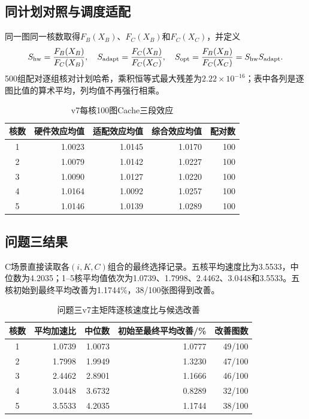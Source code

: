 \subsection{同计划对照与调度适配}
同一图同一核数取得$F_B(X_B)$、$F_C(X_B)$和$F_C(X_C)$，并定义
\begin{equation}
S_{\rm hw}=\frac{F_B(X_B)}{F_C(X_B)},\quad S_{\rm adapt}=\frac{F_C(X_B)}{F_C(X_C)},\quad S_{\rm opt}=\frac{F_B(X_B)}{F_C(X_C)}=S_{\rm hw}S_{\rm adapt}.
\label{eq:cache-factors}
\end{equation}
500组配对逐组核对计划哈希，乘积恒等式最大残差为$2.22\times10^{-16}$；表中各列是逐图比值的算术平均，列均值不再强行相乘。
\begin{table}[H]\centering\small\caption{v7每核100图Cache三段效应}\label{tab:cache-factors}
\begin{tabular}{crrrr}\toprule
核数 & 硬件效应均值 & 适配效应均值 & 综合效应均值 & 配对数\\\midrule
1 & 1.0023 & 1.0145 & 1.0170 & 100\\
2 & 1.0079 & 1.0142 & 1.0227 & 100\\
3 & 1.0090 & 1.0127 & 1.0220 & 100\\
4 & 1.0164 & 1.0092 & 1.0257 & 100\\
5 & 1.0146 & 1.0139 & 1.0289 & 100\\\bottomrule
\end{tabular}
\end{table}

\subsection{问题三结果}
C场景直接读取各$(i,K,C)$组合的最终选择记录。五核平均速度比为3.5533，中位数为4.2035；1--5核平均值依次为1.0739、1.7998、2.4462、3.0448和3.5533。五核初始到最终平均改善为1.1744\%，38/100张图得到改善。
\begin{table}[H]\centering\small\caption{问题三v7主矩阵逐核速度比与候选改善}\label{tab:c-results}
\begin{tabular}{crrrr}\toprule
核数 & 平均加速比 & 中位数 & 初始至最终平均改善/\% & 改善图数\\\midrule
1 & 1.0739 & 1.0073 & 1.0777 & 49/100\\
2 & 1.7998 & 1.9949 & 1.3230 & 47/100\\
3 & 2.4462 & 2.8901 & 1.1666 & 46/100\\
4 & 3.0448 & 3.6732 & 0.8289 & 32/100\\
5 & 3.5533 & 4.2035 & 1.1744 & 38/100\\\bottomrule
\end{tabular}
\end{table}

